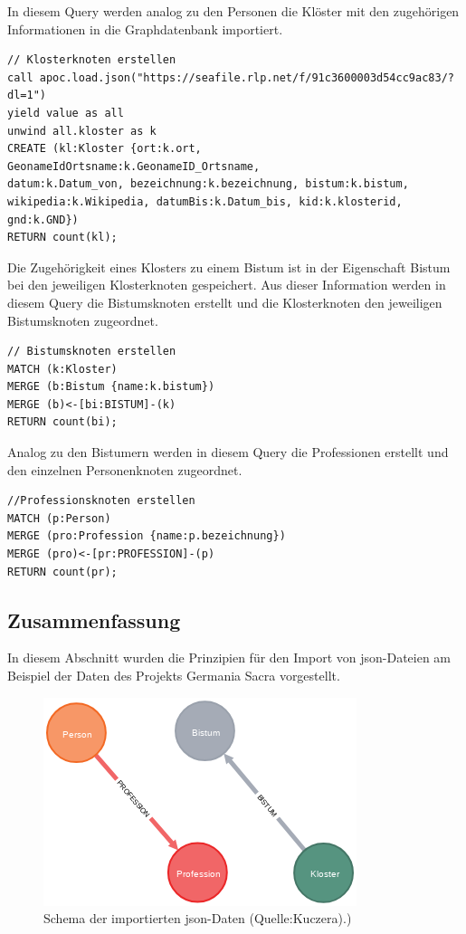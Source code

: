 \documentclass[12pt,ngerman,]{article}
\begin{document}
In diesem Query werden analog zu den Personen die Klöster mit den
zugehörigen Informationen in die Graphdatenbank importiert.

\begin{verbatim}
// Klosterknoten erstellen
call apoc.load.json("https://seafile.rlp.net/f/91c3600003d54cc9ac83/?dl=1")
yield value as all
unwind all.kloster as k
CREATE (kl:Kloster {ort:k.ort,
GeonameIdOrtsname:k.GeonameID_Ortsname,
datum:k.Datum_von, bezeichnung:k.bezeichnung, bistum:k.bistum,
wikipedia:k.Wikipedia, datumBis:k.Datum_bis, kid:k.klosterid, gnd:k.GND})
RETURN count(kl);
\end{verbatim}

Die Zugehörigkeit eines Klosters zu einem Bistum ist in der Eigenschaft
Bistum bei den jeweiligen Klosterknoten gespeichert. Aus dieser
Information werden in diesem Query die Bistumsknoten erstellt und die
Klosterknoten den jeweiligen Bistumsknoten zugeordnet.

\begin{verbatim}
// Bistumsknoten erstellen
MATCH (k:Kloster)
MERGE (b:Bistum {name:k.bistum})
MERGE (b)<-[bi:BISTUM]-(k)
RETURN count(bi);
\end{verbatim}

Analog zu den Bistumern werden in diesem Query die Professionen erstellt
und den einzelnen Personenknoten zugeordnet.

\begin{verbatim}
//Professionsknoten erstellen
MATCH (p:Person)
MERGE (pro:Profession {name:p.bezeichnung})
MERGE (pro)<-[pr:PROFESSION]-(p)
RETURN count(pr);
\end{verbatim}

\subsection{Zusammenfassung}\label{zusammenfassung-7}

In diesem Abschnitt wurden die Prinzipien für den Import von
json-Dateien am Beispiel der Daten des Projekts Germania Sacra
vorgestellt.

\begin{figure}
\centering
\includegraphics{Bilder/GS-Schema1.png}
\caption{Schema der importierten json-Daten (Quelle:Kuczera).)}
\end{figure}
\end{document}
